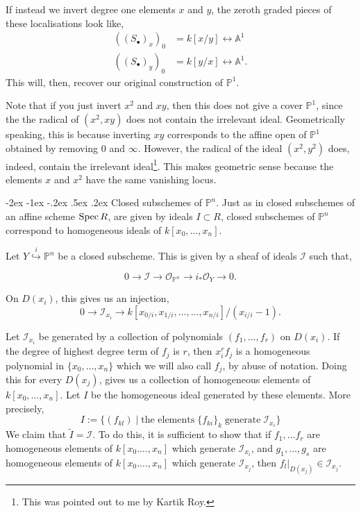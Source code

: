 \documentclass[11pt]{amsart}
\makeatletter
\renewcommand\subsection{\@startsection {subsection}{1}{\z@}%
	{-2ex \@plus -1ex \@minus -.2ex}%
	{.5ex \@plus.2ex}%
	{\normalfont\bfseries}}
\newcommand{\Spec}{{\rm Spec \,}}
\renewcommand{\tilde}{\widetilde}
\newcommand{\sI}{{\mathcal I}}
\newcommand{\sO}{{\mathcal O}}
\newcommand{\A}{{\mathbb A}}
\renewcommand{\P}{{\mathbb P}}
\theoremstyle{definition}
\makeatother
\begin{document}
If instead we invert degree one elements $x$ and $y$, the zeroth graded pieces of these localisations look like,
\begin{align*}
((S_{\bullet})_{x})_0 &=k[x/y]\longleftrightarrow\A^1\\
((S_{\bullet})_{y})_0 &=k[y/x]\longleftrightarrow\A^1.
\end{align*}
This will, then, recover our original construction of $\P^1$.

Note that if you just invert $x^2$ and $xy$, then this does not give a cover $\P^1$, since the the radical of $(x^2,xy)$ does not contain the irrelevant ideal. Geometrically speaking, this is because inverting $xy$ corresponds to the affine open of $\P^1$ obtained by removing $0$ and $\infty$. However, the radical of the ideal $(x^2,y^2)$ does, indeed, contain the irrelevant ideal\footnote{This was pointed out to me by Kartik Roy.}. This makes geometric sense because the elements $x$ and $x^2$ have the same vanishing locus.

\subsection{Closed subschemes of \texorpdfstring{$\P^n$}{Pn}.}
\label{subsection-closed-in-proj}
Just as in closed subschemes of an affine scheme $\Spec R$, are given by ideals $I\subset R$, closed subschemes of $\P^n$ correspond to homogeneous ideals of $k[x_0,\ldots,x_n]$.

Let $Y\overset{i}{\hookrightarrow} \P^n$ be a closed subscheme. This is given by a sheaf of ideals $\sI$ such that,

\[0\rightarrow \sI\rightarrow \sO_{\P^n}\rightarrow i_*\sO_Y\rightarrow 0.\]

On $D(x_i)$, this gives us an injection,
\[0\rightarrow \sI_{x_i}\rightarrow k[x_{0/i},x_{1/i},\ldots,\ldots,x_{n/i}]/(x_{i/i}-1). \]

Let $\sI_{x_i}$ be generated by a collection of polynomials $(f_1,\ldots,f_r)$ on $D(x_i)$. If the degree of highest degree term of $f_j$ is $r$, then $x_i^rf_j$ is a homogeneous polynomial in $\lbrace x_0,\ldots,x_n\rbrace$ which we will also call $f_j$, by abuse of notation. Doing this for every $D(x_j)$, gives us a collection of homogeneous elements of $k[x_0,\ldots,x_n]$. Let $I$ be the homogeneous ideal generated by these elements. More precisely,
\[I:=\lbrace (f_{kl})\;|\; \text{the elements}\; \lbrace f_{ki}\rbrace_k\; \text{generate}\; \sI_{x_i}\rbrace\]
We claim that $\tilde{I}=\sI$. To do this, it is sufficient to show that if $f_1,\ldots f_r$ are homogeneous elements of $k[x_0.\ldots,x_n]$ which generate $\sI_{x_i}$, and $g_1,\ldots,g_s$ are homogeneous elements of $k[x_0.\ldots,x_n]$ which generate $\sI_{x_j}$, then $f_l|_{D(x_j)}\in \sI_{x_j}$.
\end{document}
